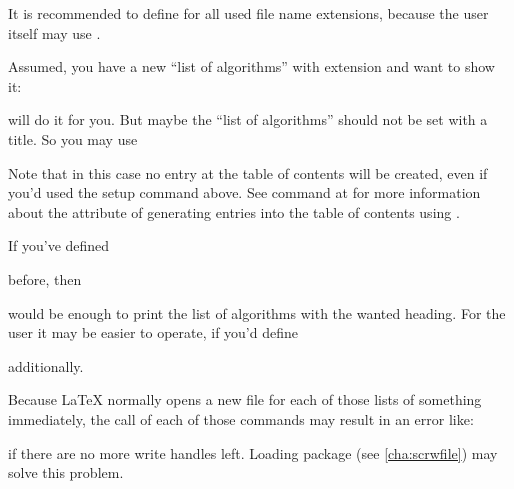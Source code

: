 It is recommended to define
 for all used file name extensions, because
the user itself may use .
\begin{Example}
  Assumed, you have a new ``list of algorithms'' with extension 
  and want to show it:
\begin{lstcode}
\end{lstcode}
  will do it for you. But maybe the ``list of algorithms'' should not be set
  with a title. So you may use
\begin{lstcode}
\end{lstcode}
  Note that in this case no entry at the table of contents will be created,
  even if you'd used the setup command above.
  See command 
  at 
  for more information about the
  attribute of generating entries into the table of contents using
  .

  If you've defined
\begin{lstcode}
  \newcommand*{\listofloaname}{%
    List of Algorithms%
  }
\end{lstcode}
  before, then
\begin{lstcode}
\end{lstcode}
  would be enough to print the list of algorithms with the wanted heading. For
  the user it may be easier to operate, if you'd define
\begin{lstcode}
  \newcommand*{\listofalgorithms}{\listoftoc{loa}}
\end{lstcode}
  additionally.
\end{Example}

Because \LaTeX{} normally opens a new file for each of
those lists of something immediately, the call of each of those commands may
result in an error like:
if there are no more write handles left. Loading package
(see \autoref{cha:scrwfile})
may solve this problem.
\EndIndexGroup


